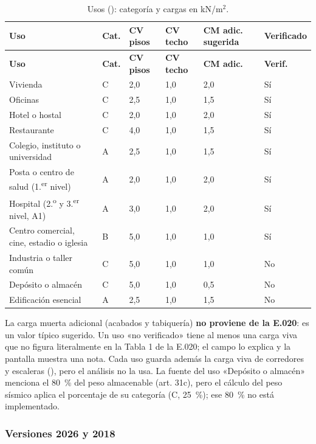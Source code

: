 \begin{longtable}{L{4.0cm}L{0.9cm}L{1.3cm}L{1.3cm}L{1.7cm}L{1.9cm}}
	\caption{Usos (): categoría y cargas en kN/m$^2$.} \label{tab:sis-uso} \\
	\hline
	\textbf{Uso} & \textbf{Cat.} & \textbf{CV pisos} & \textbf{CV techo} & \textbf{CM adic. sugerida} &
	\textbf{Verificado} \\ \hline
	\endfirsthead
	\hline
	\textbf{Uso} & \textbf{Cat.} & \textbf{CV pisos} & \textbf{CV techo} & \textbf{CM adic.} & \textbf{Verif.} \\ \hline
	\endhead
	\hline
	\endfoot
	Vivienda & C & 2,0 & 1,0 & 2,0 & Sí \\
	Oficinas & C & 2,5 & 1,0 & 1,5 & Sí \\
	Hotel o hostal & C & 2,0 & 1,0 & 2,0 & Sí \\
	Restaurante & C & 4,0 & 1,0 & 1,5 & Sí \\
	Colegio, instituto o universidad & A & 2,5 & 1,0 & 1,5 & Sí \\
	Posta o centro de salud (1.\textsuperscript{er} nivel) & A & 2,0 & 1,0 & 2,0 & Sí \\
	Hospital (2.\textsuperscript{o} y 3.\textsuperscript{er} nivel, A1) & A & 3,0 & 1,0 & 2,0 & Sí \\
	Centro comercial, cine, estadio o iglesia & B & 5,0 & 1,0 & 1,0 & Sí \\
	Industria o taller común & C & 5,0 & 1,0 & 1,0 & No \\
	Depósito o almacén & C & 5,0 & 1,0 & 0,5 & No \\
	Edificación esencial & A & 2,5 & 1,0 & 1,5 & No \\
\end{longtable}

La carga muerta adicional (acabados y tabiquería) \textbf{no proviene de la E.020}: es un valor típico sugerido. Un uso
«no verificado» tiene al menos una carga viva que no figura literalmente en la Tabla 1 de la E.020; el campo
 lo explica y la pantalla muestra una nota. Cada uso guarda además la carga viva de corredores y escaleras
(), pero el análisis no la usa. La fuente del uso «Depósito o almacén» menciona el 80~\% del
peso almacenable (art. 31c), pero el cálculo del peso sísmico aplica el porcentaje de su categoría (C, 25~\%); ese 80~\%
no está implementado.

\subsubsection{Versiones 2026 y 2018}

